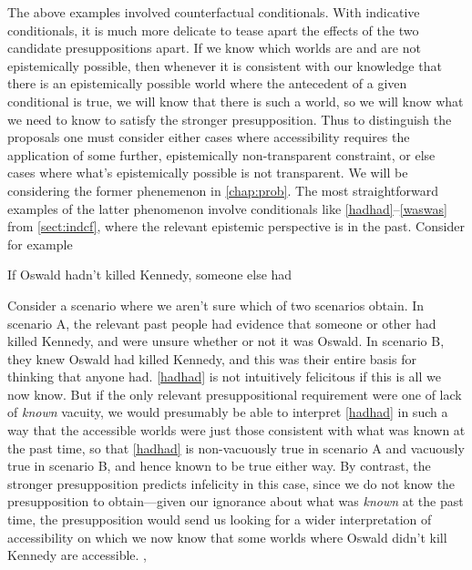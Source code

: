 \documentclass[If.tex]{subfiles}
\begin{document}
The above examples involved counterfactual conditionals. With indicative conditionals, it is much more delicate to tease apart the effects of the two candidate presuppositions apart. If we know which worlds are and are not epistemically possible, then whenever it is consistent with our knowledge that there is an epistemically possible world where the antecedent of a given conditional is true, we will know that there is such a world, so we will know what we need to know to satisfy the stronger presupposition. Thus to distinguish the proposals one must consider either cases where accessibility requires the application of some further, epistemically non-transparent constraint, or else cases where what's epistemically possible is not transparent. We will be considering the former phenemenon in \autoref{chap:prob}.  The most straightforward examples of the latter phenomenon involve conditionals like \ref{hadhad}--\ref{waswas} from \autoref{sect:indcf}, where the relevant epistemic perspective is in the past. Consider for example
\begin{prop}
	\sitem[\ref{hadhad}] 
	If Oswald hadn't killed Kennedy, someone else had 
\end{prop}
Consider a scenario where we aren't sure which of two scenarios obtain. In scenario A, the relevant past people had evidence that someone or other had killed Kennedy, and were unsure whether or not it was Oswald. In scenario B, they knew Oswald had killed Kennedy, and this was their entire basis for thinking that anyone had. \ref{hadhad} is not intuitively felicitous if this is all we now know. But if the only relevant presuppositional requirement were one of lack of \emph{known} vacuity, we would presumably be able to interpret \ref{hadhad} in such a way that the accessible worlds were just those consistent with what was known at the past time, so that \ref{hadhad} is non-vacuously true in scenario A and vacuously true in scenario B, and hence known to be true either way. By contrast, the stronger presupposition predicts infelicity in this case, since we do not know the presupposition to obtain---given our ignorance about what was \emph{known} at the past time, the presupposition would send us looking for a wider interpretation of accessibility on which we now know that some worlds where Oswald didn't kill Kennedy are accessible.%
,%
\end{document}
